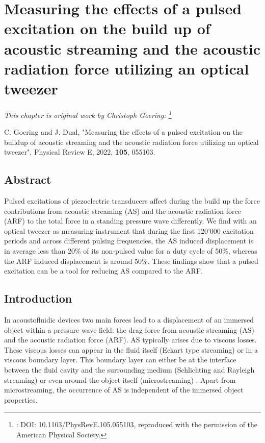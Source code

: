 \renewcommand{\relPath}{SECTION/40_Pulsing/}

\chapter[Pulsed Build up Measurement]{Measuring the effects of a pulsed 
  excitation on the build up of acoustic streaming and the acoustic radiation 
  force utilizing an optical tweezer
}\label{ch:pulsing}
\textit{This chapter is original work by Christoph Goering:
\footnote{: DOI: 10.1103/PhysRevE.105.055103, reproduced with the permission of 
  the American Physical Society.
}}

\vspace{5mm} \noindent
C. Goering and J. Dual, "Measuring the effects of a pulsed excitation on the 
buildup of acoustic streaming and the acoustic radiation force utilizing an 
optical tweezer", Physical Review E, 2022, \textbf{105}, 055103.


\section{Abstract}

Pulsed excitations of piezoelectric transducers affect during the build up the 
force contributions from acoustic streaming (AS) and the acoustic radiation 
force (ARF) to the total force in a standing pressure wave differently. We find 
with an optical tweezer as measuring instrument that during the first 120'000 
excitation periods and across different pulsing frequencies, the AS induced 
displacement is in average less than 20\% of its non-pulsed value for a duty 
cycle of 50\%, whereas the ARF induced displacement is around 50\%. These 
findings show that a pulsed excitation can be a tool for reducing AS compared 
to the ARF.
\section{Introduction}

In acoustofluidic devices two main forces lead to a displacement of an immersed 
object within a pressure wave field: the drag force from acoustic streaming 
(AS) and the acoustic radiation force (ARF). AS typically arises due to viscous 
losses. These viscous losses can appear in the fluid itself (Eckart type 
streaming) \cite{Eckart1948} or in a viscous boundary layer. This boundary 
layer can either be at the interface between the fluid cavity and the 
surrounding medium (Schlichting and Rayleigh streaming) 
\cite{Nyborg1965,Schlichting1932} or even around the object itself 
(microstreaming) \cite{Baasch2019}. Apart from microstreaming, the occurrence 
of AS is independent of the immersed object properties.

